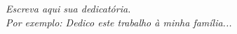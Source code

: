 \begin{dedicatoria}
   \vspace*{\fill}
   \centering
   \noindent
   \textit{Escreva aqui sua dedicatória.\\
   Por exemplo: Dedico este trabalho à minha família...} \vspace*{\fill}
\end{dedicatoria}

